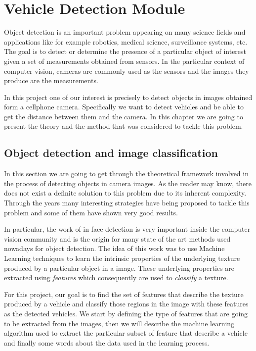 \chapter{Vehicle Detection Module}  \label{kap:vehicle-detection}

Object detection is an important problem appearing on many science fields and
applications like for example robotics, medical science, surveillance systems, etc. The
goal is to detect or determine the presence of a particular object of interest
given a set of measurements obtained from sensors. In the particular context of
computer vision, cameras are commonly used as the sensors and the images they
produce are the measurements.

In this project one of our interest is precisely to detect objects in images 
obtained form a cellphone camera. Specifically we want to detect vehicles and 
be able to get the distance between them and the camera. In this
chapter we are going to present the theory and the method that was considered to
tackle this problem.

\section{Object detection and image classification} %
\label{sec:objectdetec}

In this section we are going to get through the theoretical framework involved
in the process of detecting objects in camera images. As the reader may know,
there does not exist a definite solution to this problem due to its inherent
complexity. Through the years many interesting strategies have being proposed to
tackle this problem and some of them have shown very good results.

In particular, the work of \cite{viola-jones} in face detection is very
important inside the computer vision community and is the origin for many state
of the art methods used nowadays for object detection. The idea of this work was
to use Machine Learning techniques to learn the intrinsic properties of the
underlying texture produced by a particular object in a image. These underlying
properties are extracted using \textit{features} which consequently are
used to \textit{classify} a texture.

For this project, our goal is to find the set of features that describe the
texture produced by a vehicle and classify those regions in the image with these
features as the detected vehicles. We start by defining the type of features
that are going to be extracted from the images, then we will describe the
machine learning algorithm used to extract the particular subset of feature that
describe a vehicle and finally some words about the data used in the learning
process.

